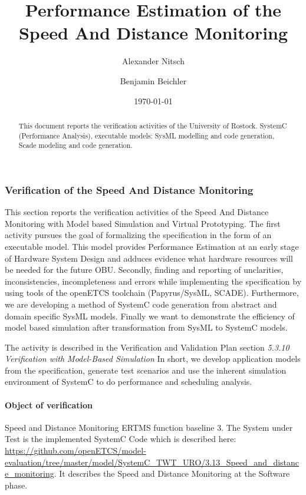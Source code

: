 \documentclass{article}
\title{Performance Estimation of the Speed And Distance Monitoring}
\author{Alexander Nitsch \and Benjamin Beichler}
\date{\today}
\newcommand{\nl}{\mbox{}\\}
\begin{document}
\maketitle
\begin{abstract}
  This document reports the verification activities of the University of Rostock. SystemC (Performance Analysis), executable models: SysML modelling and code generation, Scade modeling and code generation.
\end{abstract}


\subsubsection{Verification of the  Speed And Distance Monitoring}

This section reports the verification activities of the Speed And Distance Monitoring with Model based Simulation and Virtual Prototyping. The first activity pursues the goal of formalizing the specification in the form of an executable model. This model provides Performance Estimation at an early stage of Hardware System Design and adduces evidence what hardware resources will be needed for the future OBU. Secondly, finding and reporting of unclarities, inconsistencies, incompleteness and errors while implementing the specification by using tools of the openETCS toolchain (Papyrus/SysML, SCADE). Furthermore, we are developing a method of SystemC code generation from abstract and domain specific SysML models. Finally we want to demonstrate the efficiency of model based simulation after transformation from SysML to SystemC models.

The activity is described in the Verification and Validation Plan
section {\em 5.3.10 Verification with Model-Based Simulation} \cite{???}
In short, we develop application models from the specification, generate test scenarios and use the inherent simulation environment of SystemC to do performance and scheduling analysis.

\paragraph{Object of verification}  Speed and Distance Monitoring ERTMS function baseline 3.
The System under Test is the implemented SystemC Code which is described  here: \url{https://github.com/openETCS/model-evaluation/tree/master/model/SystemC_TWT_URO/3.13_Speed_and_distance_monitoring}. It describes the Speed and Distance Monitoring at the Software phase.
\nl
\end{document}
